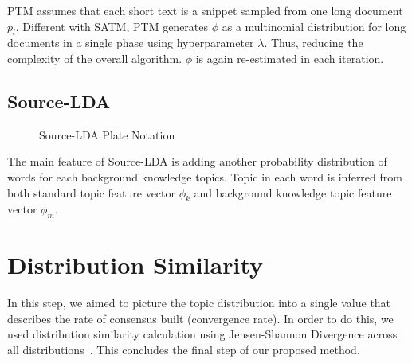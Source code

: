 \documentclass[senior]{IPSstyle}
\begin{document}
PTM assumes that each short text is a snippet sampled from one long document $p_l$. Different with SATM, PTM generates $\phi$ as a multinomial distribution for long documents in a single phase using hyperparameter $\lambda$. Thus, reducing the complexity of the overall algorithm. $\phi$ is again re-estimated in each iteration.

\subsection{Source-LDA~\cite{wood}}
\label{subsec_src}

\begin{figure}[h]
	\centering
	\caption{Source-LDA Plate Notation}
\label{fig_src}
\end{figure}

The main feature of Source-LDA is adding another probability distribution of words for each background knowledge topics. Topic in each word is inferred from both standard topic feature vector $\phi_k$ and background knowledge topic feature vector $\phi_m$.

\section{Distribution Similarity}

In this step, we aimed to picture the topic distribution into a single value that describes the rate of consensus built (convergence rate). In order to do this, we used distribution similarity calculation using Jensen-Shannon Divergence across all distributions~\cite{aslam}. This concludes the final step of our proposed method.
\end{document}
